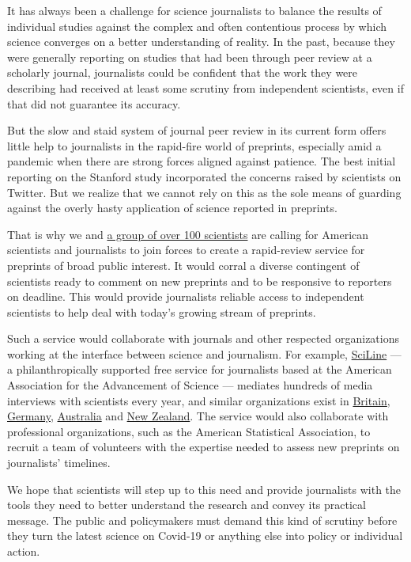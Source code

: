 It has always been a challenge for science journalists to balance the
results of individual studies against the complex and often contentious
process by which science converges on a better understanding of reality.
In the past, because they were generally reporting on studies that had
been through peer review at a scholarly journal, journalists could be
confident that the work they were describing had received at least some
scrutiny from independent scientists, even if that did not guarantee its
accuracy.

But the slow and staid system of journal peer review in its current form
offers little help to journalists in the rapid-fire world of preprints,
especially amid a pandemic when there are strong forces aligned against
patience. The best initial reporting on the Stanford study incorporated
the concerns raised by scientists on Twitter. But we realize that we
cannot rely on this as the sole means of guarding against the overly
hasty application of science reported in preprints.

That is why we and
\href{https://docs.google.com/spreadsheets/d/1NgNbxbMq6X4EBY3Zv8sFQhpqLNNOHRce9VfaWbynI5U/edit?usp=sharing}{a
group of over 100 scientists} are calling for American scientists and
journalists to join forces to create a rapid-review service for
preprints of broad public interest. It would corral a diverse contingent
of scientists ready to comment on new preprints and to be responsive to
reporters on deadline. This would provide journalists reliable access to
independent scientists to help deal with today's growing stream of
preprints.

Such a service would collaborate with journals and other respected
organizations working at the interface between science and journalism.
For example, \href{https://www.sciline.org/}{SciLine} --- a
philanthropically supported free service for journalists based at the
American Association for the Advancement of Science --- mediates
hundreds of media interviews with scientists every year, and similar
organizations exist in
\href{https://www.sciencemediacentre.org/}{Britain},
\href{https://www.sciencemediacenter.de/en/our-offers/portfolio}{Germany},
\href{https://www.smc.org.au/}{Australia} and
\href{https://www.sciencemediacentre.co.nz/}{New Zealand}. The service
would also collaborate with professional organizations, such as the
American Statistical Association, to recruit a team of volunteers with
the expertise needed to assess new preprints on journalists' timelines.

We hope that scientists will step up to this need and provide
journalists with the tools they need to better understand the research
and convey its practical message. The public and policymakers must
demand this kind of scrutiny before they turn the latest science on
Covid-19 or anything else into policy or individual action.

